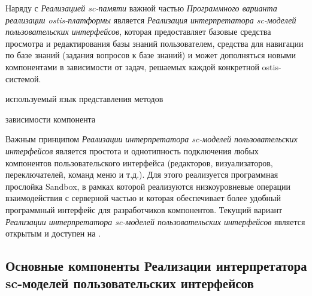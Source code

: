 Наряду с \textit{Реализацией sc-памяти} важной частью \textit{Программного варианта реализации ostis-платформы} является \textit{Реализация интерпретатора sc-моделей пользовательских интерфейсов}, которая предоставляет базовые средства просмотра и редактирования базы знаний пользователем, средства для навигации по базе знаний (задания вопросов к базе знаний) и может дополняться новыми компонентами в зависимости от задач, решаемых каждой конкретной ostis-системой.

\begin{SCn}
	\begin{scnrelfromlist}{используемый язык представления методов}
	\end{scnrelfromlist}
	\begin{scnrelfromset}{зависимости компонента}
	\end{scnrelfromset}
\end{SCn}

Важным принципом \textit{Реализации интерпретатора sc-моделей пользовательских интерфейсов} является простота и однотипность подключения любых компонентов пользовательского интерфейса (редакторов, визуализаторов, переключателей, команд меню и т.д.). Для этого реализуется программная прослойка Sandbox, в рамках которой реализуются низкоуровневые операции взаимодействия с серверной частью и которая обеспечивает более удобный программный интерфейс для разработчиков компонентов. Текущий вариант \textit{Реализации интерпретатора sc-моделей пользовательских интерфейсов} является открытым и доступен на \cite{sc-web}.

\subsection{Основные компоненты Реализации интерпретатора sc-моделей пользовательских интерфейсов}
\label{sec_soft_platform_sci_machine_components}

